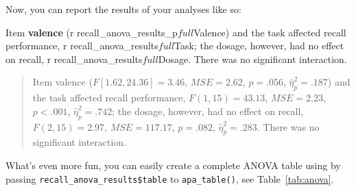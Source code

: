 \documentclass[
  man,floatsintext]{apa6}
\newenvironment{Shaded}{\begin{snugshade}}{\end{snugshade}}
\newcommand{\AttributeTok}[1]{\textcolor[rgb]{0.13,0.29,0.53}{#1}}
\newcommand{\FunctionTok}[1]{\textcolor[rgb]{0.13,0.29,0.53}{\textbf{#1}}}
\newcommand{\NormalTok}[1]{#1}
\newcommand{\SpecialCharTok}[1]{\textcolor[rgb]{0.81,0.36,0.00}{\textbf{#1}}}
\newcommand{\StringTok}[1]{\textcolor[rgb]{0.31,0.60,0.02}{#1}}
\begin{document}
Now, you can report the results of your analyses like so:

\begin{Shaded}
\begin{Highlighting}[]
\NormalTok{Item }\FunctionTok{valence}\NormalTok{ (}\StringTok{\textasciigrave{}}\AttributeTok{r recall\_anova\_results\_p$full$Valence}\StringTok{\textasciigrave{}}\NormalTok{) and the task}
\NormalTok{affected recall performance, }\StringTok{\textasciigrave{}}\AttributeTok{r recall\_anova\_results$full$Task}\StringTok{\textasciigrave{}}\NormalTok{; the dosage,}
\NormalTok{however, had no effect on recall, }\StringTok{\textasciigrave{}}\AttributeTok{r recall\_anova\_results$full$Dosage}\StringTok{\textasciigrave{}}\NormalTok{.}
\NormalTok{There was no significant interaction.}
\end{Highlighting}
\end{Shaded}

\begin{quote}
Item valence (\(F[1.62, 24.36] = 3.46\), \(\mathit{MSE} = 2.62\), \(p = .056\), \(\hat{\eta}^2_p = .187\)) and the task affected recall performance, \(F(1, 15) = 43.13\), \(\mathit{MSE} = 2.23\), \(p < .001\), \(\hat{\eta}^2_p = .742\);
the dosage, however, had no effect on recall, \(F(2, 15) = 2.97\), \(\mathit{MSE} = 117.17\), \(p = .082\), \(\hat{\eta}^2_p = .283\).
There was no significant interaction.
\end{quote}

What's even more fun, you can easily create a complete ANOVA table using by passing \texttt{recall\_anova\_results\$table} to \texttt{apa\_table()}, see Table~\ref{tab:anova}.





\begin{Shaded}
\end{Shaded}
\end{document}
